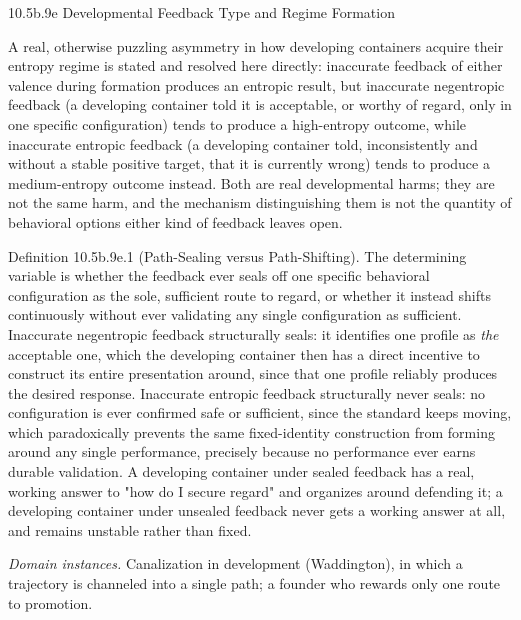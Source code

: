 \documentclass[
]{article}
\begin{document}
10.5b.9e Developmental Feedback Type and Regime Formation

A real, otherwise puzzling asymmetry in how developing containers
acquire their entropy regime is stated and resolved here directly:
inaccurate feedback of either valence during formation produces an
entropic result, but inaccurate negentropic feedback (a developing
container told it is acceptable, or worthy of regard, only in one
specific configuration) tends to produce a high-entropy outcome, while
inaccurate entropic feedback (a developing container told,
inconsistently and without a stable positive target, that it is
currently wrong) tends to produce a medium-entropy outcome instead. Both
are real developmental harms; they are not the same harm, and the
mechanism distinguishing them is not the quantity of behavioral options
either kind of feedback leaves open.

Definition 10.5b.9e.1 (Path-Sealing versus Path-Shifting). The
determining variable is whether the feedback ever seals off one specific
behavioral configuration as the sole, sufficient route to regard, or
whether it instead shifts continuously without ever validating any
single configuration as sufficient. Inaccurate negentropic feedback
structurally seals: it identifies one profile as \emph{the} acceptable
one, which the developing container then has a direct incentive to
construct its entire presentation around, since that one profile
reliably produces the desired response. Inaccurate entropic feedback
structurally never seals: no configuration is ever confirmed safe or
sufficient, since the standard keeps moving, which paradoxically
prevents the same fixed-identity construction from forming around any
single performance, precisely because no performance ever earns durable
validation. A developing container under sealed feedback has a real,
working answer to "how do I secure regard" and organizes around
defending it; a developing container under unsealed feedback never gets
a working answer at all, and remains unstable rather than fixed.

\emph{Domain instances.} Canalization in development (Waddington), in
which a trajectory is channeled into a single path; a founder who
rewards only one route to promotion.
\end{document}
